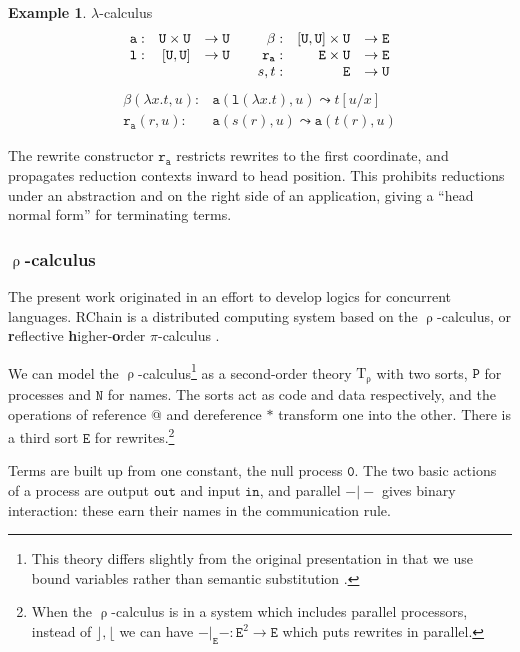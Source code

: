 \documentclass[12pt]{article}
\theoremstyle{definition}
\newtheorem{example}[theorem]{Example}
\newcommand{\mrm}[1]{\mathrm{#1}}
\newcommand{\mtt}[1]{\mathtt{#1}}
\newcommand{\T}{\mrm{T}}
\newcommand{\ttu}{\mtt{U}}
\newcommand{\N}{\mtt{N}}
\newcommand{\PP}{\mtt{P}}
\newcommand{\tto}{\mtt{out}}
\newcommand{\tti}{\mtt{in}}
\newcommand{\ttz}{\mtt{0}}
\begin{document}
\begin{example} $\lambda$-calculus
\[\begin{array}{rrl@{\quad\quad}rrl}
    \mtt{a}: &\ttu \times \ttu & \to \ttu & \beta: &[\ttu,\ttu] \times \ttu &\to \mtt{E} \\
    \mtt{l}: &[\ttu,\ttu] &\to \ttu &
    \mtt{r}_{\mtt{a}}: &\mtt{E} \times \ttu & \to \mtt{E}\\
    &&& s,t:&\mtt{E} &\to \ttu
\end{array}\]
\[\begin{array}{rl}
    \beta(\lambda x.t, u): & \mtt{a}(\mtt{l}(\lambda x.t), u) \leadsto t[u/x]\\
    \mtt{r}_{\mtt{a}}(r, u): & \mtt{a}(s(r), u) \leadsto \mtt{a}(t(r), u)
\end{array}\]

The rewrite constructor $\mtt{r}_{\mtt{a}}$ restricts rewrites to the first coordinate, and propagates reduction contexts inward to head position.  This prohibits reductions under an abstraction and on the right side of an application, giving a ``head normal form'' for terminating terms.
\end{example}

\subsubsection{$\uprho$-calculus}
\label{ssec:rho}

The present work originated in an effort to develop logics for concurrent languages. RChain \cite{rchain} is a distributed computing system based on the  $\uprho$-calculus, or \textbf{r}eflective \textbf{h}igher-\textbf{o}rder $\pi$-calculus \cite{rhocal}.

We can model the $\uprho$-calculus\footnote{This theory differs slightly from the original presentation in that we use bound variables rather than semantic substitution \cite[section 2.7]{rhocal}.} as a second-order theory $\T_\uprho$ with two sorts, $\PP$ for processes and $\N$ for names. The sorts act as code and data respectively, and the operations of reference @ and dereference $\ast$ transform one into the other. There is a third sort $\mtt{E}$ for rewrites.\footnote{When the $\uprho$-calculus is in a system which includes parallel processors, instead of $\rfloor,\lfloor$ we can have $-\vert_\mtt{E}-:\mtt{E}^2\to \mtt{E}$ which puts rewrites in parallel.}

Terms are built up from one constant, the null process $\ttz$. The two basic actions of a process are output $\tto$ and input $\tti$, and parallel $-\vert-$ gives binary interaction: these earn their names in the communication rule.  
\end{document}
